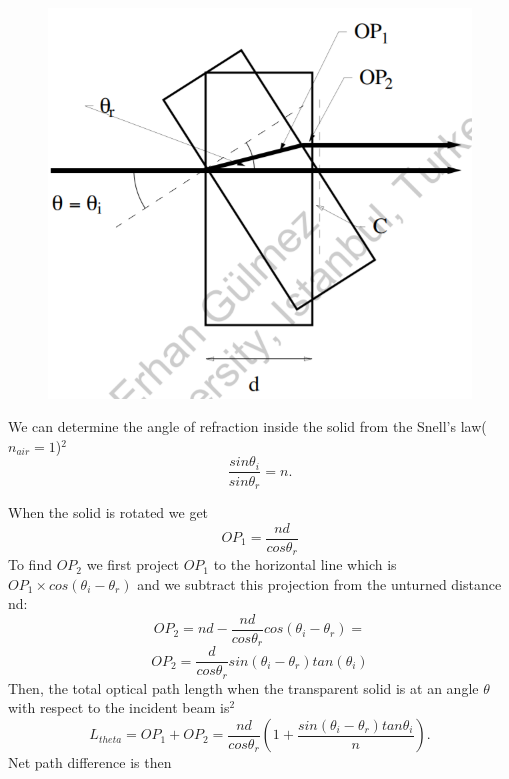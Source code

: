 \documentclass[10pt,a4paper]{article}
\begin{document}
{\begin{figure}[H]
\begin{center}
		\includegraphics[scale=0.6]{n.png}
	\end{center}
\end{figure}
We can determine the angle of refraction inside the solid from the Snell's law($n_{air}=1$)$^2$
\begin{equation}
\frac{sin\theta_i}{sin\theta_r}=n.
\end{equation}
\par When the solid is rotated we get
\begin{equation}
OP_1=\frac{nd}{cos\theta_r}
\end{equation}
To find $OP_2$ we first project $OP_1$ to the horizontal line which is $OP_1\times cos(\theta_i-\theta_r)$ and we subtract this projection from the unturned distance nd:
\begin{equation}
OP_2=nd-\frac {nd}{cos\theta_r}cos(\theta_i-\theta_r)=
\end{equation}
\begin{equation}
OP_2=\frac{d}{cos\theta_r}sin(\theta_i-\theta_r)tan(\theta_i)
\end{equation}
Then, the total optical path length when the transparent solid is at an angle $\theta$ with respect to the incident beam is$^2$
\begin{equation}
L_{theta}=OP_1+OP_2=\frac {nd}{cos\theta_r}(1+\frac {sin(\theta_i-\theta_r)tan\theta_i}{n}).
\end{equation}
Net path difference is then
}
\end{document}
